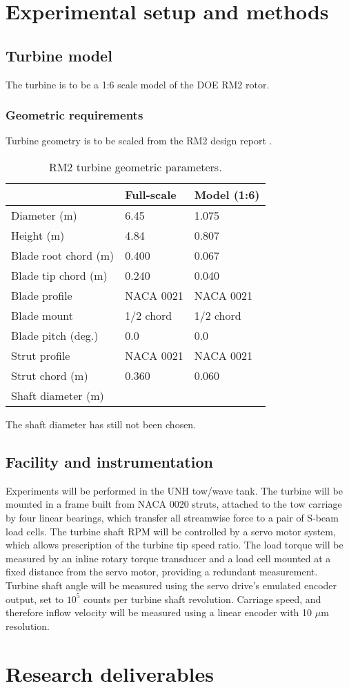 \documentclass{article}
\begin{document}
\section{Experimental setup and methods}

\subsection{Turbine model}

The turbine is to be a 1:6 scale model of the DOE RM2 rotor.

\subsubsection{Geometric requirements}

Turbine geometry is to be scaled from the RM2 design report \cite{Barone2011}.

\begin{table}[ht]
\centering
\begin{tabular}{l|l|l}
   & Full-scale & Model (1:6) \\
\hline 
Diameter (m)   & 6.45 & 1.075 \\ 
Height (m)     & 4.84 & 0.807 \\ 
Blade root chord (m) & 0.400 & 0.067 \\ 
Blade tip chord (m)  & 0.240 & 0.040 \\ 
Blade profile & NACA 0021 & NACA 0021 \\ 
Blade mount & 1/2 chord & 1/2 chord \\ 
Blade pitch (deg.) & 0.0 & 0.0 \\ 
Strut profile & NACA 0021 & NACA 0021 \\ 
Strut chord (m) & 0.360 & 0.060 \\ 
Shaft diameter (m) &  &  \\ 
\end{tabular}
\caption{RM2 turbine geometric parameters.}
\end{table}

The shaft diameter has still not been chosen.


\subsection{Facility and instrumentation}

Experiments will be performed in the UNH tow/wave tank. The turbine will be
mounted in a frame built from NACA 0020 struts, attached to the tow carriage by
four linear bearings, which transfer all streamwise force to a pair of S-beam
load cells. The turbine shaft RPM will be controlled by a servo motor system,
which allows prescription of the turbine tip speed ratio. The load torque will
be measured by an inline rotary torque transducer and a load cell mounted at a
fixed distance from the servo motor, providing a redundant measurement. Turbine
shaft angle will be measured using the servo drive's emulated encoder output,
set to $10^5$ counts per turbine shaft revolution. Carriage speed, and therefore
inflow velocity will be measured using a linear encoder with 10 $\mu$m
resolution.


\section{Research deliverables}




\end{document}
